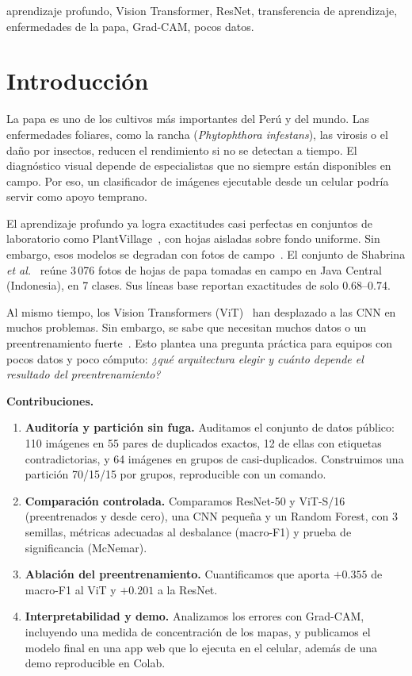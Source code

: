 \documentclass[conference,a4paper]{IEEEtran}
\begin{document}
\begin{IEEEkeywords}
aprendizaje profundo, Vision Transformer, ResNet, transferencia de aprendizaje, enfermedades de la papa, Grad-CAM, pocos datos.
\end{IEEEkeywords}

\section{Introducción}
La papa es uno de los cultivos más importantes del Perú y del mundo. Las enfermedades foliares, como la rancha (\textit{Phytophthora infestans}), las virosis o el daño por insectos, reducen el rendimiento si no se detectan a tiempo. El diagnóstico visual depende de especialistas que no siempre están disponibles en campo. Por eso, un clasificador de imágenes ejecutable desde un celular podría servir como apoyo temprano.

El aprendizaje profundo ya logra exactitudes casi perfectas en conjuntos de laboratorio como PlantVillage~\cite{mohanty2016plant,ferentinos2018plant}, con hojas aisladas sobre fondo uniforme. Sin embargo, esos modelos se degradan con fotos de campo~\cite{mohanty2016plant}. El conjunto de Shabrina \textit{et al.}~\cite{shabrina2024potato} reúne 3\,076 fotos de hojas de papa tomadas en campo en Java Central (Indonesia), en 7 clases. Sus líneas base reportan exactitudes de solo 0.68--0.74.

Al mismo tiempo, los Vision Transformers (ViT)~\cite{dosovitskiy2021vit} han desplazado a las CNN en muchos problemas. Sin embargo, se sabe que necesitan muchos datos o un preentrenamiento fuerte~\cite{dosovitskiy2021vit,touvron2021deit,steiner2022howtotrain}. Esto plantea una pregunta práctica para equipos con pocos datos y poco cómputo: \emph{¿qué arquitectura elegir y cuánto depende el resultado del preentrenamiento?}

\textbf{Contribuciones.}
\begin{enumerate}
\item \textbf{Auditoría y partición sin fuga.} Auditamos el conjunto de datos público: 110 imágenes en 55 pares de duplicados exactos, 12 de ellas con etiquetas contradictorias, y 64 imágenes en grupos de casi-duplicados. Construimos una partición 70/15/15 por grupos, reproducible con un comando.
\item \textbf{Comparación controlada.} Comparamos ResNet-50 y ViT-S/16 (preentrenados y desde cero), una CNN pequeña y un Random Forest, con 3 semillas, métricas adecuadas al desbalance (macro-F1) y prueba de significancia (McNemar).
\item \textbf{Ablación del preentrenamiento.} Cuantificamos que aporta $+0.355$ de macro-F1 al ViT y $+0.201$ a la ResNet.
\item \textbf{Interpretabilidad y demo.} Analizamos los errores con Grad-CAM, incluyendo una medida de concentración de los mapas, y publicamos el modelo final en una app web que lo ejecuta en el celular, además de una demo reproducible en Colab.
\end{enumerate}
\end{document}
